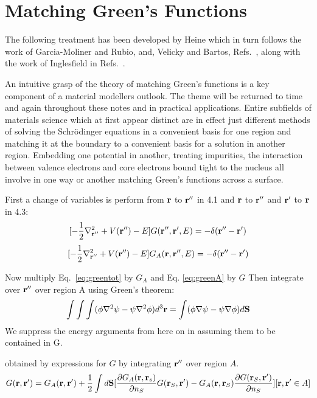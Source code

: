 \section{Matching Green's Functions}
The following treatment has been developed by Heine which in turn follows the 
work of Garcia-Moliner and Rubio, and, Velicky and Bartos, Refs.~\cite{garcia69, velicky71, garcia71},
along with the work of Inglesfield in Refs.~\cite{inglesfield71,inglesfield81}.

An intuitive grasp of the theory of matching Green's functions is a key component of a material
modellers outlook. The theme will be returned to time and again throughout these notes and in
practical applications. Entire subfields of materials science which at first appear distinct 
are in effect just different methods of solving the Schr\"odinger equations in a convenient
basis for one region and matching it at the boundary to a convenient basis 
for a solution in another region. Embedding one potential in another, treating impurities,
the interaction between valence electrons and core electrons bound tight to the nucleus all
involve in one way or another matching Green's functions across a surface.


First a change of variables is perform from ${\bf r}$ to ${\bf r}''$ in 4.1 
and ${\bf r}$ to ${\bf r}''$ and ${\bf r}'$ to ${\bf r}$ in 4.3:
%
\begin{equation}
\label{eq:greentot}
[-\frac{1}{2}\nabla^{2}_{{\bf r}''} + V({\bf r}'') - E]G({\bf r}'',{\bf r}',E)= -\delta({\bf r}''-{\bf r}')
\end{equation}
%
\begin{equation}
\label{eq:greenA}
[-\frac{1}{2}\nabla^{2}_{{\bf r}''} + V({\bf r}'') - E]G_{A}({\bf r},{\bf r}'',E)= -\delta({\bf r}''-{\bf r}')
\end{equation}

Now multiply Eq.~\ref{eq:greentot} by $G_{A}$ and Eq.
\ref{eq:greenA} by $G$ Then integrate over ${\bf r}''$ over region A using
Green's theorem:
%
\begin{equation}
\label{eq:greenthm}
\int\int\int(\phi\nabla^{2}\psi - \psi\nabla^{2}\phi)d^{3}{\bf r} 
= \int(\phi\nabla\psi-\psi\nabla\phi)d{\mathbf{S}}
\end{equation}
%
We suppress the energy arguments from here on in assuming them to be contained in G. 

obtained by expressions for $G$ by integrating ${\bf r}''$ over region $A$.
%
\begin{equation}
\label{eq:green1a}
G({\bf r},{\bf r}') = G_{A}({\bf r},{\bf r}') + \frac{1}{2} \int d\mathbf{S} 
[\frac{\partial G_{A}({\bf r},{\bf r}_{s})}{\partial n_{S}}G({\bf r}_{S},{\bf r}') - G_{A}({\bf r},{\bf r}_{S})\frac{\partial G({\bf r}_{S},{\bf r}')}{\partial n_{S}}] [{\bf r}, {\bf r}' \in A]
\end{equation}

